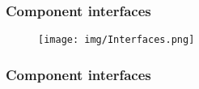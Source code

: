 	\subsubsection{Component interfaces}	
		\begin{figure}[h]
			\texttt{[image: img/Interfaces.png]}
		\end{figure}
		
			
	\subsubsection{Component interfaces}